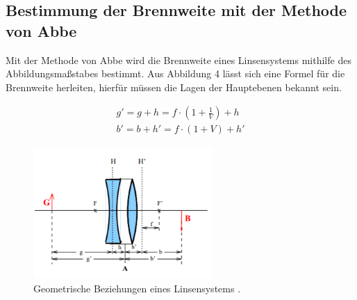 \subsection{Bestimmung der Brennweite mit der Methode von Abbe}
Mit der Methode von Abbe wird die Brennweite eines Linsensystems mithilfe des Abbildungsmaßstabes bestimmt.
Aus Abbildung 4 lässt sich eine Formel für die Brennweite herleiten, hierfür müssen die Lagen
der Hauptebenen bekannt sein.

\begin{align}
  g'= g + h = f \cdot \left(1 + \frac{1}{V} \right) + h \\
  b' = b + h' = f \cdot (1+V) + h'
\end{align}

\begin{figure}[H]
  \centering
  \includegraphics[height=5cm]{abbe.PNG}
  \caption{Geometrische Beziehungen eines Linsensystems \cite{sample}.}
  \label{fig:biegungbild1}
\end{figure}
